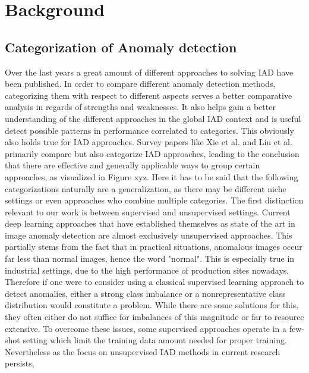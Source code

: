 \chapter{Background}
\label{chap:background}



\section{Categorization of Anomaly detection}
\label{sec:IADcategs}
Over the last years a great amount of different approaches to solving IAD have been published. In order to compare different anomaly detection methods, categorizing them with respect to different 
aspects serves a better comparative analysis in regards of strengths and weaknesses.  It also helps gain a better understanding of the different approaches in the global IAD context and
is useful detect possible patterns in performance correlated to categories. This obviously also holds true for IAD approaches. Survey papers like Xie et al. \cite{Xie_2024benchmarking} and 
Liu et al.
\cite{liu2024deep} primarily compare but also categorize IAD approaches, leading to the conclusion that there are effective and generally applicable ways to group certain approaches, as 
visualized in Figure xyz. Here it has to be said that the following categorizations naturally are a generalization, as there may be different niche settings or even approaches who combine multiple categories.
\newline
The first distinction relevant to our work is between supervised and unsupervised settings. Current deep learning approaches that have established themselves as state of the art in image anomaly detection 
are almost exclusively unsupervised approaches. This partially stems from the fact 
that in practical situations, anomalous images occur far less than normal images, hence the word "normal". This is especially true in industrial settings, due to the high performance of 
production sites nowadays. Therefore if one were to consider using a classical supervised learning approach to detect anomalies, either a strong class imbalance or a nonrepresentative class 
distribution would constitute a problem. While there are some solutions for this, they often either do not suffice for imbalances of this magnitude or far to resource extensive. To overcome 
these issues, some supervised approaches \cite{Chu_2020supervised} operate in a few-shot setting which limit the training data amount needed for proper training. Nevertheless as the focus on 
unsupervised IAD methods in current research persists, 
